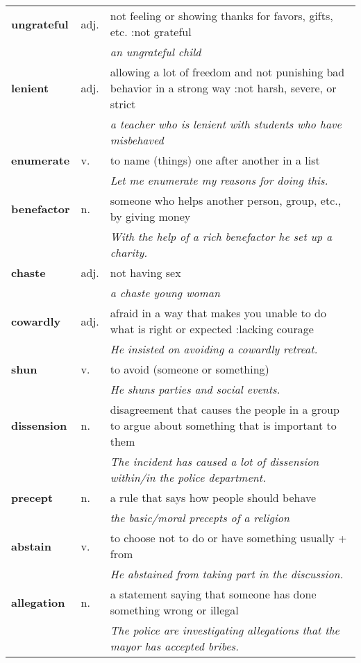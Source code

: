 \documentclass[a4paper]{article}
\begin{document}
\begin{longtable}{llp{11cm}}
\textbf{ungrateful} & adj. &  not feeling or showing thanks for favors, gifts, etc. :not grateful \\
 & & \textit{an ungrateful child}\\[0.08cm]
\textbf{lenient} & adj. &  allowing a lot of freedom and not punishing bad behavior in a strong way :not harsh, severe, or strict \\
 & & \textit{a teacher who is lenient with students who have misbehaved}\\[0.08cm]
\textbf{enumerate} & v. &  to name (things) one after another in a list \\
 & & \textit{Let me enumerate my reasons for doing this.}\\[0.08cm]
\textbf{benefactor} & n. &  someone who helps another person, group, etc., by giving money \\
 & & \textit{With the help of a rich benefactor he set up a charity.}\\[0.08cm]
\textbf{chaste} & adj. &  not having sex \\
 & & \textit{a chaste young woman}\\[0.08cm]
\textbf{cowardly} & adj. &  afraid in a way that makes you unable to do what is right or expected :lacking courage \\
 & & \textit{He insisted on avoiding a cowardly retreat.}\\[0.08cm]
\textbf{shun} & v. &  to avoid (someone or something) \\
 & & \textit{He shuns parties and social events.}\\[0.08cm]
\textbf{dissension} & n. &  disagreement that causes the people in a group to argue about something that is important to them \\
 & & \textit{The incident has caused a lot of dissension within/in the police department.}\\[0.08cm]
\textbf{precept} & n. &  a rule that says how people should behave \\
 & & \textit{the basic/moral precepts of a religion}\\[0.08cm]
\textbf{abstain} & v. &  to choose not to do or have something usually + from \\
 & & \textit{He abstained from taking part in the discussion.}\\[0.08cm]
\textbf{allegation} & n. &  a statement saying that someone has done something wrong or illegal \\
 & & \textit{The police are investigating allegations that the mayor has accepted bribes.}\\[0.08cm]

\end{longtable}
\end{document}
